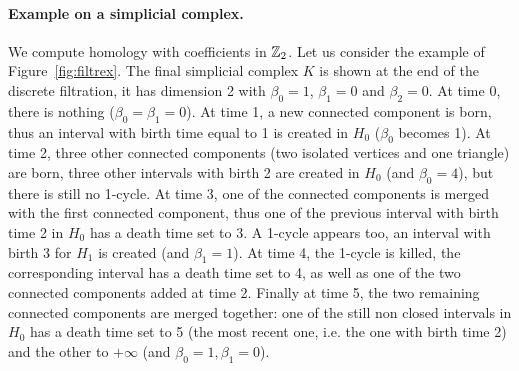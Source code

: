 \paragraph*{Example on a simplicial complex.} We compute homology  with coefficients in $\mathbb{Z}_2$. Let us consider the example of Figure~\ref{fig:filtrex}.  
The final simplicial complex $K$ is shown at the end of the discrete filtration, it 
has dimension 2 with $\beta_{0}=1$, $\beta_{1}=0$ and $\beta_{2}=0$. 
At time 0, there is nothing ($\beta_{0}=\beta_{1}=0$). 
At time 1, a new connected component is born, thus an interval with  birth time equal to 1 is created in $H_{0}$ 
($\beta_{0}$ becomes 1). At time 2, three other connected components (two isolated vertices and one triangle) are 
born, three other intervals with birth 2 are created in $H_{0}$ (and $\beta_{0}=4$), but there is 
still no 1-cycle. At time 3, one of the connected components is merged with the first connected component, 
thus one of the previous interval with birth time 2 in $H_{0}$ has a death time set to 3.
A 1-cycle appears too, an interval with birth 3 for $H_{1}$ is created (and $\beta_{1}=1$). At time 4, 
the 1-cycle is killed, the corresponding interval has a death time set to 4,
as well as one of the two connected components added at time 2. %
Finally at time 5, the 
two remaining connected components are merged together: one of the still non closed intervals in $H_{0}$ has 
a death time set to 5 (the most recent one, i.e. the one with birth time 2) and the other to 
$+\infty$ (and $\beta_{0}=1,\beta_{1}=0$).  

